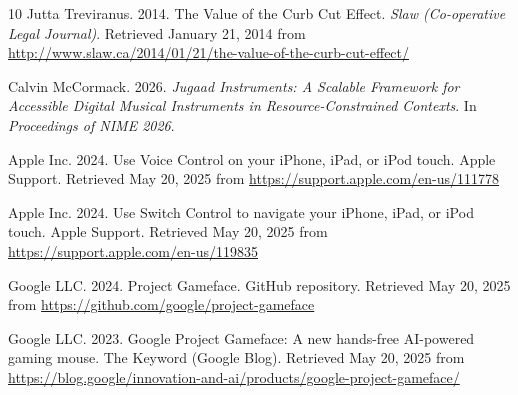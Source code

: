 \documentclass[manuscript,screen,review,anonymous]{acmart}
\begin{document}
\begin{thebibliography}{10}
Jutta Treviranus. 2014.
The Value of the Curb Cut Effect.
\textit{Slaw (Co-operative Legal Journal)}.
Retrieved January 21, 2014 from \url{http://www.slaw.ca/2014/01/21/the-value-of-the-curb-cut-effect/}


Calvin McCormack. 2026.
\textit{Jugaad Instruments: A Scalable Framework for Accessible Digital Musical Instruments in Resource-Constrained Contexts}.
 In \textit{Proceedings of NIME 2026}.

Apple Inc. 2024.
Use Voice Control on your iPhone, iPad, or iPod touch.
Apple Support.
Retrieved May 20, 2025 from \url{https://support.apple.com/en-us/111778}

Apple Inc. 2024.
Use Switch Control to navigate your iPhone, iPad, or iPod touch.
Apple Support.
Retrieved May 20, 2025 from \url{https://support.apple.com/en-us/119835}

Google LLC. 2024.
Project Gameface.
GitHub repository.
Retrieved May 20, 2025 from \url{https://github.com/google/project-gameface}

Google LLC. 2023.
Google Project Gameface: A new hands-free AI-powered gaming mouse.
The Keyword (Google Blog).
Retrieved May 20, 2025 from \url{https://blog.google/innovation-and-ai/products/google-project-gameface/}


\end{thebibliography}
\end{document}
